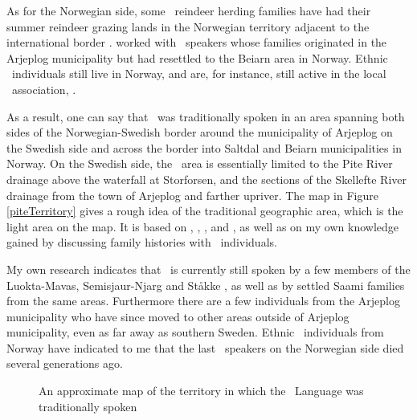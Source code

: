 As for the Norwegian side, some \PS\ reindeer herding families have had their summer reindeer grazing lands in the Norwegian territory adjacent to the international border \cite[cf.][]{Manker1947}. \citet{Lagercrantz1926} worked with \PS\ speakers whose families originated in the Arjeplog municipality but had resettled to the Beiarn area in Norway. Ethnic \PS\ individuals still live in Norway, and are, for instance, still active in the local \PS\ association, . 

As a result, one can say that \PS\ was traditionally spoken in an area spanning both sides of the Norwegian-Swedish border around the municipality of Arjeplog on the Swedish side and across the border into Saltdal and Beiarn municipalities in Norway. %
On the Swedish side, the \PS\ area is essentially limited to the Pite River %
drainage above the waterfall at Storforsen, and the sections of the Skellefte River %
drainage from the town of Arjeplog and farther upriver. %
The map in Figure \vref{piteTerritory} gives a rough idea of the traditional geographic area, which is the light area on the map. It is based on  \citet{Lagercrantz1926}, \citet{Ruong1943}, \citet{Manker1947}, \citet{Bergsland1962} and \citet{Sammallahti1998}, as well as on my own knowledge gained by discussing family histories with \PS\ individuals.

My own research indicates that \PS\ is currently still spoken by a few members of the Luokta-Mavas, Semisjaur-Njarg and Ståkke , as well as by settled Saami families from the same areas. Furthermore there are a few individuals from the Arjeplog municipality who have since moved to other areas outside of Arjeplog municipality, %
even as far away as southern Sweden. %
Ethnic \PS\ individuals from Norway have indicated to me that the last \PS\ speakers on the Norwegian side died several generations ago.%

\setlength\fboxsep{0pt}
\setlength\fboxrule{1pt}
\begin{figure}
\centering
{}
\parbox{150mm}{\caption{An approximate map of the territory in which the \PS\ Language was traditionally spoken\label{piteTerritory}}}%
\end{figure}%

